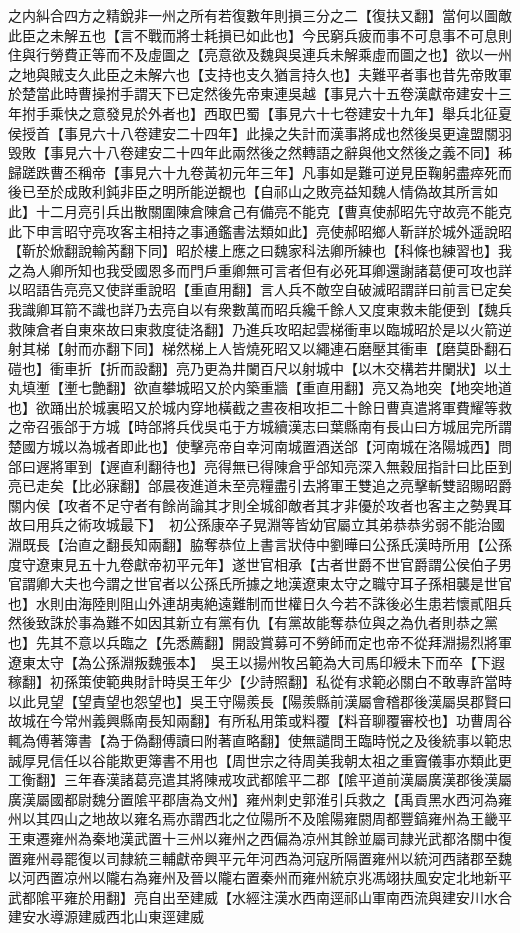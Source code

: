 之内糾合四方之精銳非一州之所有若復數年則損三分之二【復扶又翻】當何以圖敵此臣之未解五也【言不戰而將士耗損已如此也】今民窮兵疲而事不可息事不可息則住與行勞費正等而不及虛圖之【亮意欲及魏與吳連兵未解乘虛而圖之也】欲以一州之地與賊支久此臣之未解六也【支持也支久猶言持久也】夫難平者事也昔先帝敗軍於楚當此時曹操拊手謂天下已定然後先帝東連吳越【事見六十五卷漢獻帝建安十三年拊手乘快之意發見於外者也】西取巴蜀【事見六十七卷建安十九年】舉兵北征夏侯授首【事見六十八卷建安二十四年】此操之失計而漢事將成也然後吳更違盟關羽毁敗【事見六十八卷建安二十四年此兩然後之然轉語之辭與他文然後之義不同】秭歸蹉跌曹丕稱帝【事見六十九卷黃初元年三年】凡事如是難可逆見臣鞠躬盡瘁死而後已至於成敗利鈍非臣之明所能逆覩也【自祁山之敗亮益知魏人情偽故其所言如此】十二月亮引兵出散關圍陳倉陳倉己有備亮不能克【曹真使郝昭先守故亮不能克此下申言昭守亮攻客主相持之事通鑑書法類如此】亮使郝昭鄉人靳詳於城外遥說昭【靳於焮翻說輸芮翻下同】昭於樓上應之曰魏家科法卿所練也【科條也練習也】我之為人卿所知也我受國恩多而門戶重卿無可言者但有必死耳卿還謝諸葛便可攻也詳以昭語告亮亮又使詳重說昭【重直用翻】言人兵不敵空自破滅昭謂詳曰前言已定矣我識卿耳箭不識也詳乃去亮自以有衆數萬而昭兵纔千餘人又度東救未能便到【魏兵救陳倉者自東來故曰東救度徒洛翻】乃進兵攻昭起雲梯衝車以臨城昭於是以火箭逆射其梯【射而亦翻下同】梯然梯上人皆燒死昭又以繩連石磨壓其衝車【磨莫卧翻石磑也】衝車折【折而設翻】亮乃更為井闌百尺以射城中【以木交構若井闌狀】以土丸填壍【壍七艶翻】欲直攀城昭又於内築重牆【重直用翻】亮又為地突【地突地道也】欲踊出於城裏昭又於城内穿地橫截之晝夜相攻拒二十餘日曹真遣將軍費耀等救之帝召張郃于方城【時郃將兵伐吳屯于方城續漢志曰葉縣南有長山曰方城屈完所謂楚國方城以為城者即此也】使擊亮帝自幸河南城置酒送郃【河南城在洛陽城西】問郃曰遟將軍到【遟直利翻待也】亮得無已得陳倉乎郃知亮深入無穀屈指計曰比臣到亮已走矣【比必寐翻】郃晨夜進道未至亮糧盡引去將軍王雙追之亮擊斬雙詔賜昭爵關内侯【攻者不足守者有餘尚論其才則全城卻敵者其才非優於攻者也客主之勢異耳故曰用兵之術攻城最下】　初公孫康卒子晃淵等皆幼官屬立其弟恭恭劣弱不能治國淵既長【治直之翻長知兩翻】脇奪恭位上書言狀侍中劉曄曰公孫氏漢時所用【公孫度守遼東見五十九卷獻帝初平元年】遂世官相承【古者世爵不世官爵謂公侯伯子男官謂卿大夫也今謂之世官者以公孫氏所據之地漢遼東太守之職守耳子孫相襲是世官也】水則由海陸則阻山外連胡夷絶遠難制而世權日久今若不誅後必生患若懷貳阻兵然後致誅於事為難不如因其新立有黨有仇【有黨故能奪恭位與之為仇者則恭之黨也】先其不意以兵臨之【先悉薦翻】開設賞募可不勞師而定也帝不從拜淵揚烈將軍遼東太守【為公孫淵叛魏張本】　吳王以揚州牧呂範為大司馬印綬未下而卒【下遐稼翻】初孫策使範典財計時吳王年少【少詩照翻】私從有求範必關白不敢專許當時以此見望【望責望也怨望也】吳王守陽羨長【陽羨縣前漢屬會稽郡後漢屬吳郡賢曰故城在今常州義興縣南長知兩翻】有所私用策或料覆【料音聊覆審校也】功曹周谷輒為傅著簿書【為于偽翻傅讀曰附著直略翻】使無譴問王臨時悦之及後統事以範忠誠厚見信任以谷能欺更簿書不用也【周世宗之待周美我朝太祖之重竇儀事亦類此更工衡翻】三年春漢諸葛亮遣其將陳戒攻武都隂平二郡【隂平道前漢屬廣漢郡後漢屬廣漢屬國都尉魏分置隂平郡唐為文州】雍州刺史郭淮引兵救之【禹貢黑水西河為雍州以其四山之地故以雍名焉亦謂西北之位陽所不及隂陽雍閼周都豐鎬雍州為王畿平王東遷雍州為秦地漢武置十三州以雍州之西偏為凉州其餘並屬司隷光武都洛關中復置雍州尋罷復以司隸統三輔獻帝興平元年河西為河寇所隔置雍州以統河西諸郡至魏以河西置凉州以隴右為雍州及晉以隴右置秦州而雍州統京兆馮翊扶風安定北地新平武都隂平雍於用翻】亮自出至建威【水經注漢水西南逕祁山軍南西流與建安川水合建安水導源建威西北山東逕建威